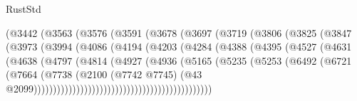 \begin{lexlean}{RustStd}
\begin{coremodule}
                            (@3442
                              (@3563
                                (@3576
                                  (@3591
                                    (@3678
                                      (@3697
                                        (@3719
                                          (@3806
                                            (@3825
                                              (@3847
                                                (@3973
                                                  (@3994
                                                    (@4086
                                                      (@4194
                                                        (@4203
                                                          (@4284
                                                            (@4388
                                                              (@4395
                                                                (@4527
                                                                  (@4631
                                                                    (@4638
                                                                      (@4797
                                                                        (@4814
                                                                          (@4927
                                                                            (@4936
                                                                              (@5165
                                                                                (@5235
                                                                                  (@5253
                                                                                    (@6492
                                                                                      (@6721
                                                                                        (@7664
                                                                                          (@7738
                                                                                            (@2100
                                                                                              (@7742
                                                                                                @7745)
                                                                                              (@43
                                                                                                @2099))))))))))))))))))))))))))))))))))))))))))))))

\end{coremodule}
\end{lexlean}
